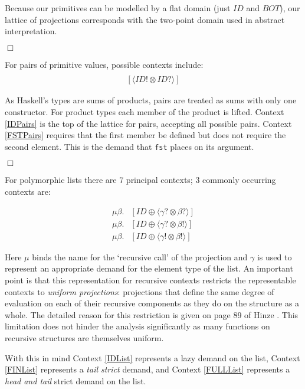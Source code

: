 Because our primitives can be modelled by a flat domain (just $ID$ and $BOT$),
our lattice of projections corresponds with the two-point domain used in
abstract interpretation.

\hfill$\Box$

For pairs of primitive values, possible contexts include:
\begin{align}
[\langle ID? \otimes ID? \rangle] \label{IDPairs} \\
[\langle ID! \otimes ID? \rangle] \label{FSTPairs}
\end{align}


As Haskell's types are sums of products, pairs are treated as sums with only
one constructor.  For product types each member of the product is lifted.
Context \ref{IDPairs} is the top of the lattice for pairs, accepting all
possible pairs. Context \ref{FSTPairs} requires that the first member be
defined but does not require the second element. This is the demand that
\verb-fst- places on its argument.

\hfill$\Box$

For polymorphic lists there are 7 principal contexts; 3 commonly occurring contexts are:

\begin{align}
    \mu\beta.&[ID \oplus \langle \gamma? \otimes \beta?\rangle] \label{IDList} \\
    \mu\beta.&[ID \oplus \langle \gamma? \otimes \beta!\rangle] \label{FINList} \\
    \mu\beta.&[ID \oplus \langle \gamma! \otimes \beta!\rangle] \label{FULLList}
\end{align}


Here $\mu$ binds the name for the `recursive call' of the projection and
$\gamma$ is used to represent an appropriate demand for the element type of the
list.  An important point is that this representation for recursive contexts
restricts the representable contexts to \emph{uniform projections}: projections
that define the same degree of evaluation on each of their recursive components
as they do on the structure as a whole. The detailed reason for this
restriction is given on page 89 of Hinze \citep{hinze1995projection}. This
limitation does not hinder the analysis significantly as many functions on
recursive structures are themselves uniform.

With this in mind Context \ref{IDList} represents a lazy demand on the list,
Context \ref{FINList} represents a \emph{tail strict} demand, and Context
\ref{FULLList} represents a \emph{head and tail} strict demand on the list.


